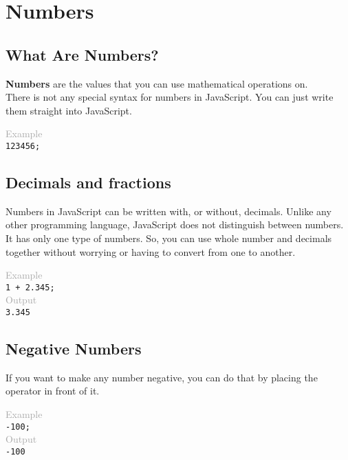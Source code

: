 \documentclass {book}
\newcommand{\bordercolor}[2]{%
	\colorlet{currentcolor}{.}%
	{\color{#1}%
		\fbox{\color{currentcolor}#2}}%
}
\begin{document}
	\chapter{Numbers}
	\section{What Are Numbers?}
	\textbf{Numbers} are the values that you can use mathematical operations on.\\
	There is not any special syntax for numbers in JavaScript. You can just write them straight into JavaScript.
	
	\begin{tcolorbox}
		\scriptsize
		\textcolor{darkgrey}{Example}\\
		
		\texttt{\textcolor{numbercolor}{123456};}

	\end{tcolorbox}
	
	\section{Decimals and fractions}
	Numbers in JavaScript can be written with, or without, decimals.
	Unlike any other programming language, JavaScript does not distinguish between numbers. It has only one type of numbers. So, you can use whole number and decimals together without worrying or having to convert from one to another.
	
	\begin{tcolorbox}
		\scriptsize
		\textcolor{darkgrey}{Example}\\
		
		\texttt{\textcolor{numbercolor}{1 + 2.345};}\\
		
		\textcolor{darkgrey}{Output}\\
		
		\texttt{\textcolor{numbercolor}{3.345}}
		
	\end{tcolorbox}
	
	\section{Negative Numbers}
	If you want to make any number negative, you can do that by placing the \bordercolor{darkyellow}{-} operator in front of it.
	
	\begin{tcolorbox}
		\scriptsize
		\textcolor{darkgrey}{Example}\\
		
		\texttt{\textcolor{numbercolor}{-100};}\\
		
		\textcolor{darkgrey}{Output}\\
		
		\texttt{\textcolor{numbercolor}{-100}}
		
	\end{tcolorbox}
	
\end{document}
